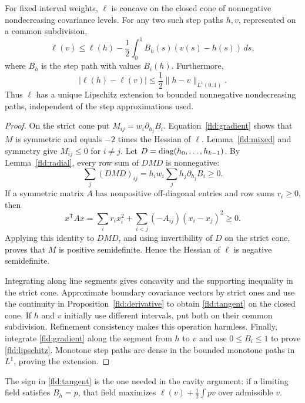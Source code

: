 \begin{theorem}\label{fld:concavity}
For fixed interval weights, $\ell$ is concave on the closed cone of
nonnegative nondecreasing covariance levels. For any two such step
paths $h,v$, represented on a common subdivision,
\begin{equation}\label{fld:tangent}
 \ell(v)\leq\ell(h)
   -\frac12\int_0^1B_h(s)(v(s)-h(s))\,ds,
\end{equation}
where $B_h$ is the step path with values $B_i(h)$. Furthermore,
\begin{equation}\label{fld:lipschitz}
 |\ell(h)-\ell(v)|\leq\frac12\|h-v\|_{L^1(0,1)}.
\end{equation}
Thus $\ell$ has a unique Lipschitz extension to bounded nonnegative
nondecreasing paths, independent of the step approximations used.
\end{theorem}

\begin{proof}
On the strict cone put
$M_{ij}=w_i\partial_{h_j}B_i$. Equation~\eqref{fld:gradient} shows
that $M$ is symmetric and equals $-2$ times the Hessian of $\ell$.
Lemma~\ref{fld:mixed} and symmetry give $M_{ij}\leq0$ for $i\ne j$.
Let $D=\operatorname{diag}(h_0,\ldots,h_{k-1})$. By
Lemma~\ref{fld:radial}, every row sum of $DMD$ is nonnegative:
\[
 \sum_j(DMD)_{ij}
 =h_iw_i\sum_jh_j\partial_{h_j}B_i\geq0.
\]
If a symmetric matrix $A$ has nonpositive off-diagonal entries and
row sums $r_i\geq0$, then
\[
 x^{\mathsf T}Ax
 =\sum_i r_ix_i^2+
    \sum_{i<j}(-A_{ij})(x_i-x_j)^2\geq0.
\]
Applying this identity to $DMD$, and using invertibility of $D$ on the
strict cone, proves that $M$ is positive semidefinite. Hence the Hessian
of $\ell$ is negative semidefinite.

Integrating along line segments gives concavity and the supporting
inequality in the strict cone. Approximate boundary covariance vectors
by strict ones and use the continuity in
Proposition~\ref{fld:derivative} to obtain
\eqref{fld:tangent} on the closed cone. If $h$ and $v$ initially use
different intervals, put both on their common subdivision. Refinement
consistency makes this operation harmless. Finally, integrate
\eqref{fld:gradient} along the segment from $h$ to $v$ and use
$0\leq B_i\leq1$ to prove \eqref{fld:lipschitz}. Monotone step paths
are dense in the bounded monotone paths in $L^1$, proving the extension.
\end{proof}

The sign in \eqref{fld:tangent} is the one needed in the cavity
argument: if a limiting field satisfies $B_h=p$, that field maximizes
$\ell(v)+\frac12\int pv$ over admissible $v$.

